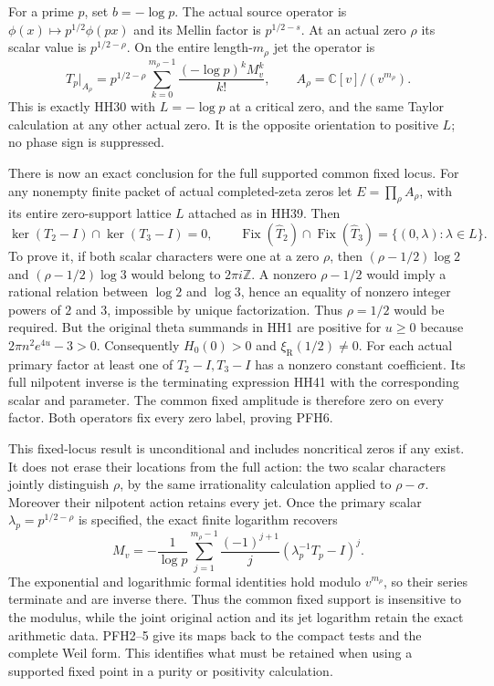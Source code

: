 For a prime $p$, set $b=-\log p$. The actual source operator is
$\phi(x)\mapsto p^{1/2}\phi(px)$ and its Mellin factor is
$p^{1/2-s}$. At an actual zero $\rho$ its scalar value is
$p^{1/2-\rho}$. On the entire length-$m_\rho$ jet the operator is
\[
 T_p|_{A_\rho}
   =p^{1/2-\rho}
      \sum_{k=0}^{m_\rho-1}
                \frac{(-\log p)^k M_v^k}{k!},
       \qquad A_\rho=\mathbb C[v]/(v^{m_\rho}).
 \tag{PFH5}
\]
This is exactly HH30 with $L=-\log p$ at a critical zero, and
the same Taylor calculation at any other actual zero. It is the
opposite orientation to positive $L$; no phase sign is suppressed.

There is now an exact conclusion for the full supported common
fixed locus. For any nonempty finite packet of actual completed-zeta
zeros let $E=\prod_\rho A_\rho$, with its entire zero-support
lattice $L$ attached as in HH39. Then
\[
 \boxed{\ker(T_2-I)\cap\ker(T_3-I)=0,\qquad
    \operatorname{Fix}(\widehat T_2)\cap
    \operatorname{Fix}(\widehat T_3)
         =\{(0,\lambda):\lambda\in L\}.}
 \tag{PFH6}
\]
To prove it, if both scalar characters were one at a zero $\rho$,
then $(\rho-1/2)\log2$ and $(\rho-1/2)\log3$ would belong to
$2\pi i\mathbb Z$. A nonzero $\rho-1/2$ would imply a rational
relation between $\log2$ and $\log3$, hence an equality of nonzero
integer powers of $2$ and $3$, impossible by unique factorization.
Thus $\rho=1/2$ would be required. But the original theta summands
in HH1 are positive for $u\ge0$ because $2\pi n^2e^{4u}-3>0$.
Consequently $H_0(0)>0$ and $\xi_{\mathrm R}(1/2)\ne0$.
For each actual primary factor at least one of $T_2-I,T_3-I$
has a nonzero constant coefficient. Its full nilpotent inverse is
the terminating expression HH41 with the corresponding scalar and
parameter. The common fixed amplitude is therefore zero on every
factor. Both operators fix every zero label, proving PFH6.

This fixed-locus result is unconditional and includes noncritical
zeros if any exist. It does not erase their locations from the full
action: the two scalar characters jointly distinguish $\rho$, by
the same irrationality calculation applied to $\rho-\sigma$.
Moreover their nilpotent action retains every jet. Once the primary
scalar $\lambda_p=p^{1/2-\rho}$ is specified, the exact finite
logarithm recovers
\[
 M_v=-\frac1{\log p}\sum_{j=1}^{m_\rho-1}
           \frac{(-1)^{j+1}}j
           (\lambda_p^{-1}T_p-I)^j.
 \tag{PFH7}
\]
The exponential and logarithmic formal identities hold modulo
$v^{m_\rho}$, so their series terminate and are inverse there.
Thus the common fixed support is insensitive to the modulus, while
the joint original action and its jet logarithm retain the exact
arithmetic data. PFH2--5 give its maps back to the compact tests and
the complete Weil form. This identifies what must be retained when
using a supported fixed point in a purity or positivity calculation.
